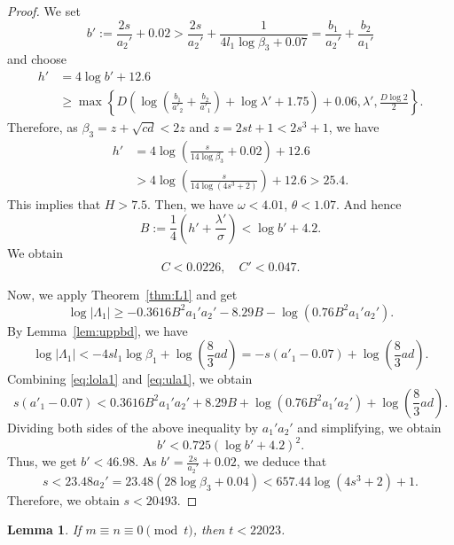 \documentclass{amsart}
\newtheorem{lemma}{Lemma}
\theoremstyle{definition}
\begin{document}
\begin{proof}
We set 
$$b':=\frac{2s}{a_2'}+0.02>\frac{2s}{a_2'} + \frac{1}{4l_1\log \beta_3+0.07}=\frac{b_1}{a_2'} + \frac{b_2}{a_1'}$$
and choose
\begin{align*}
h'&=4\log b'+  12.6\\
&\geq \max\left\{D\left(\log\left(\frac{b_1}{a'_2}+\frac{b_2}{a'_1}\right)+\log\lambda' +1.75\right)+0.06,\lambda',\frac{D\log 2}{2}\right\}.
\end{align*}
Therefore, as $\beta_3 = z+\sqrt{cd}<2z$ and  $z=2st+1<2s^3+1$, we have
\begin{align*}
h'&=4\log\left(\frac{s}{14\log\beta_3}+0.02\right)+12.6\\
&>4\log\left(\frac{s}{14\log(4s^3+2)}\right)+12.6>25.4.
\end{align*}
This implies that $H>7.5$. Then, we have $\omega<4.01$, $\theta<1.07$. And hence 
$$B:= \frac{1}{4}\left(h'+\frac{\lambda'}{\sigma}\right)<\log b'+4.2. $$
We obtain   
$$
C<0.0226,\quad C'<0.047.
$$

Now, we apply Theorem~\ref{thm:L1} and get 
\begin{equation}\label{eq:lola1}
\log|\Lambda_1| \ge -0.3616B^2a_1'a_2' -8.29B - \log (0.76B^2 a_1'a_2').
\end{equation}
By Lemma~\ref{lem:uppbd}, we have
\begin{equation}\label{eq:ula1}
\log |\Lambda_1| <-4sl_1\log \beta_1 + \log \left(\frac{8}{3}ad\right)=-s(a'_1-0.07)+ \log \left(\frac{8}{3}ad\right).
\end{equation}
Combining \eqref{eq:lola1} and \eqref{eq:ula1}, we obtain
\begin{equation}
s(a'_1-0.07)<0.3616 B^2a_1'a_2' +8.29B + \log (0.76B^2 a_1'a_2')+\log \left(\frac{8}{3}ad\right).
\end{equation}
Dividing both sides of the above inequality by $a_1'a_2'$ and simplifying, we obtain
$$
b'<0.725(\log b' + 4.2)^2. 
$$
Thus, we get $b'<46.98$.
As $b'=\frac{2s}{a_2'}+0.02$, we deduce that 
$$
s<23.48a_2'=23.48(28\log \beta_3+0.04)<657.44\log(4s^3+2)+1. 
$$
Therefore, we obtain $s<20493$.
\end{proof}

\begin{lemma}\label{lem:euler2}
If $m\equiv n\equiv 0 \pmod{t}$, then $t<22023$. 
\end{lemma}
\end{document}
